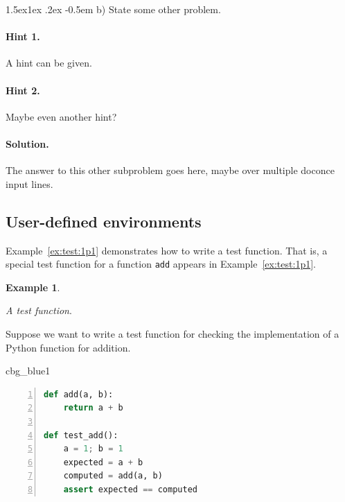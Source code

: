 \n\documentclass[%
oneside,                 %
final,                   %
10pt]{article}
\makeatletter
\newenvironment{_cod_tight}[1]{
   \def\FrameCommand{\colorbox{#1}}
   \FrameRule0.6pt\MakeFramed {\FrameRestore}\vskip3mm}
   {\vskip0mm\endMakeFramed}
\newenvironment{cod}[1]{
\bgroup\rmfamily
\fboxsep=0mm\relax
\begin{_cod_tight}{#1}
\list{}{\parsep=-2mm\parskip=0mm\topsep=0pt\leftmargin=2mm
\rightmargin=2\leftmargin\leftmargin=4pt\relax}
\item\relax}
{\endlist\end{_cod_tight}\egroup}
\newenvironment{doconceexercise}{}{}
\newcommand\subex{\@startsection{paragraph}{4}{\z@}%
                  {1.5ex\@plus1ex \@minus.2ex}%
                  {-0.5em}%
                  {\normalfont\normalsize\bfseries}}
\theoremstyle{definition}
\newtheorem{example}{Example}[section]
\makeatother
\begin{document}
\begin{enumerate}
\begin{doconceexercise}

\subex{b)}
State some other problem.

\paragraph{Hint 1.}
A hint can be given.

\paragraph{Hint 2.}
Maybe even another hint?

\paragraph{Solution.}
The answer to this other subproblem goes here,
maybe over multiple doconce input lines.


\end{doconceexercise}

\subsection{User-defined environments}

Example~\vref{ex:test:1p1} demonstrates how to write a test function.
That is, a special test function for a function \texttt{add} appears in
Example~\vref{ex:test:1p1}.

\begin{example}
\label{ex:test:1p1}

\noindent\emph{A test function}.

Suppose we want to write a test function for checking the
implementation of a Python function for addition.










\begin{cod}{cbg_blue1}\begin{lstlisting}[language=python,style=myspeciallststyle,numbers=left,numberstyle=\tiny,stepnumber=3,numbersep=15pt,xleftmargin=1mm]
def add(a, b):
    return a + b

def test_add():
    a = 1; b = 1
    expected = a + b
    computed = add(a, b)
    assert expected == computed

\end{lstlisting}\end{cod}
\noindent


\end{example}
\end{enumerate}
\end{document}
